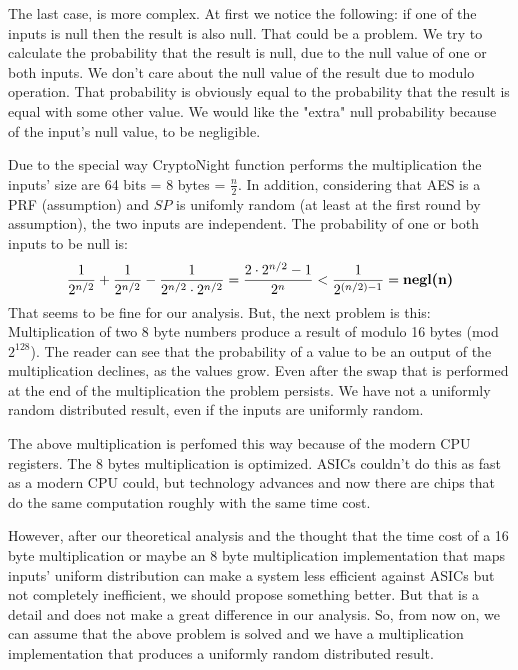 The last case, is more complex. At first we notice the following: if one of the inputs is null then the result is also null. That could be a problem. We try to calculate the probability that the result is null, due to the null value of one or both inputs. We don't care about the null value of the result due to modulo operation. That probability is obviously equal to the probability that the result is equal with some other value. We would like the "extra" null probability because of the input's null value, to be negligible.

Due to the special way CryptoNight function performs the multiplication the inputs' size are 64 bits = 8 bytes = $\frac{n}{2}$. In addition, considering that AES is a PRF (assumption) and $SP$ is unifomly random (at least at the first round by assumption), the two inputs are independent. The probability of one or both inputs to be null is:
\begin{equation} \label{prob_zero}
  \frac{1}{2^{n/2}} + \frac{1}{2^{n/2}} - \frac{1}{2^{n/2} \cdot 2^{n/2}} = \frac{2\cdot2^{n/2}-1}{2^n} < \frac{1}{2^{(n/2)-1}} = \mbox{\textbf{negl(n)}}
\end{equation}
That seems to be fine for our analysis. But, the next problem is this: Multiplication of two 8 byte numbers produce a result of modulo 16 bytes (mod $2^{128}$). The reader can see that the probability of a value to be an output of the multiplication declines, as the values grow. Even after the swap that is performed at the end of the multiplication the problem persists. We have not a uniformly random distributed result, even if the inputs are uniformly random.

The above multiplication is perfomed this way because of the modern CPU registers. The 8 bytes multiplication is optimized. ASICs couldn't do this as fast as a modern CPU could, but technology advances and now there are chips that do the same computation roughly with the same time cost.

However, after our theoretical analysis and the thought that the time cost of a 16 byte multiplication or maybe an 8 byte multiplication implementation that maps inputs' uniform distribution can make a system less efficient against ASICs but not completely inefficient, we should propose something better. But that is a detail and does not make a great difference in our analysis. So, from now on, we can assume that the above problem is solved and we have a multiplication implementation that produces a uniformly random distributed result.

